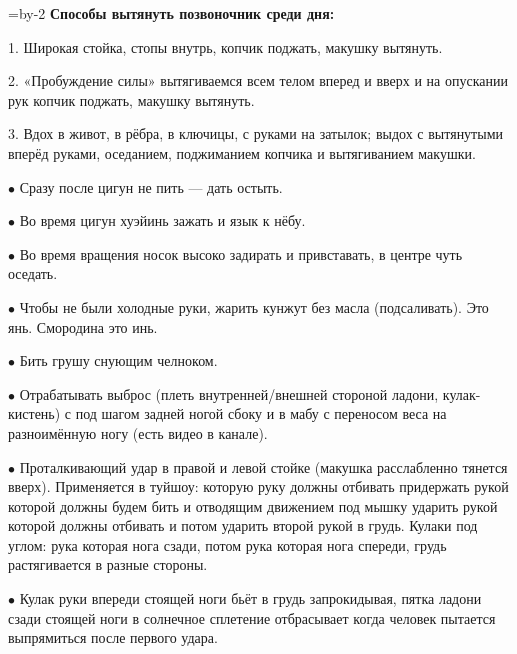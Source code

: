 \pdfvorigin=1.5cm
\pdfhorigin=1.5cm
\hsize=\pdfpagewidth \advance\hsize by-2\pdfhorigin
\vsize=25cm
{\bf Способы вытянуть позвоночник среди дня:}

\item{1.} Широкая стойка, стопы внутрь, копчик поджать, макушку вытянуть.

\item{2.} «Пробуждение силы» вытягиваемся всем телом вперед и вверх и на опускании
рук копчик поджать, макушку вытянуть.

\item{3.} Вдох в живот, в рёбра, в ключицы, с руками на затылок;
выдох с вытянутыми вперёд руками, оседанием, поджиманием копчика и
вытягиванием макушки.

\bigskip

\item{$\bullet$} Сразу после цигун не пить --- дать остыть.

\item{$\bullet$} Во время цигун хуэйинь зажать и язык к нёбу.

\item{$\bullet$} Во время вращения носок высоко задирать и привставать, в центре чуть оседать.

\item{$\bullet$} Чтобы не были холодные руки, жарить кунжут без масла (подсаливать).
Это янь. Смородина это инь.

\item{$\bullet$} Бить грушу снующим челноком.

\item{$\bullet$} Отрабатывать выброс (плеть внутренней/внешней стороной ладони, кулак-кистень) с под шагом задней ногой сбоку и в мабу с переносом веса на разноимённую ногу (есть видео в канале).

\item{$\bullet$} Проталкивающий удар в правой и левой стойке (макушка расслабленно тянется вверх).
Применяется в туйшоу: которую руку должны отбивать придержать рукой которой должны будем бить и отводящим движением под мышку ударить рукой которой должны отбивать и потом ударить второй рукой в грудь. Кулаки под углом: рука которая нога сзади, потом рука которая нога спереди, грудь растягивается в разные стороны.

\item{$\bullet$} Кулак руки впереди стоящей ноги бьёт в грудь запрокидывая, пятка ладони сзади стоящей ноги в солнечное сплетение отбрасывает когда человек пытается выпрямиться после первого удара.

